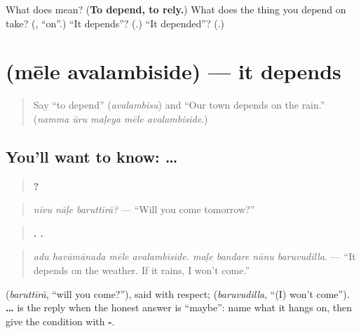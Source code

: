 \begin{tcolorbox}[breakable,colback=teal!4,colframe=teal!35!black,title={Before you move on}]
What does \textbf{} mean? (\textbf{To depend, to rely.}) What does the thing you depend on take? (\textbf{}, \textquotedblleft{}on\textquotedblright{}.) \textquotedblleft{}It depends\textquotedblright{}? (\textbf{}.) \textquotedblleft{}It depended\textquotedblright{}? (\textbf{}.)
\end{tcolorbox}
\section[\texorpdfstring{\kn{ಮೇಲೆ} \kn{ಅವಲಂಬಿಸಿದೆ} (mēle avalambiside)}{ಮೇಲೆ ಅವಲಂಬಿಸಿದೆ (mēle avalambiside)}]{  (mēle avalambiside) — it depends}

\label{lesson:KA-C318-mele-avalambiside}



\begin{quote}
Say \textquotedblleft{}to depend\textquotedblright{} (\emph{avalambisu}) and \textquotedblleft{}Our town depends on the rain.\textquotedblright{} (\emph{namma ūru maḷeya mēle avalambiside}.)
\end{quote}

\subsection*{You'll want to know:  …  }
\begin{quote}
\textbf{  ?}
\end{quote}

\begin{quote}
\emph{nīvu nāḷe baruttīrā?} — \textquotedblleft{}Will you come tomorrow?\textquotedblright{}
\end{quote}

\begin{quote}
\textbf{   .    .}
\end{quote}

\begin{quote}
\emph{adu havāmānada mēle avalambiside. maḷe bandare nānu baruvudilla.} — \textquotedblleft{}It depends on the weather. If it rains, I won't come.\textquotedblright{}
\end{quote}

\textbf{} (\emph{baruttīrā}, \textquotedblleft{}will you come?\textquotedblright{}), said with respect; \textbf{} (\emph{baruvudilla}, \textquotedblleft{}(I) won't come\textquotedblright{}). \textbf{ …  } is the reply when the honest answer is \textquotedblleft{}maybe\textquotedblright{}: name what it hangs on, then give the condition with \textbf{-}.

